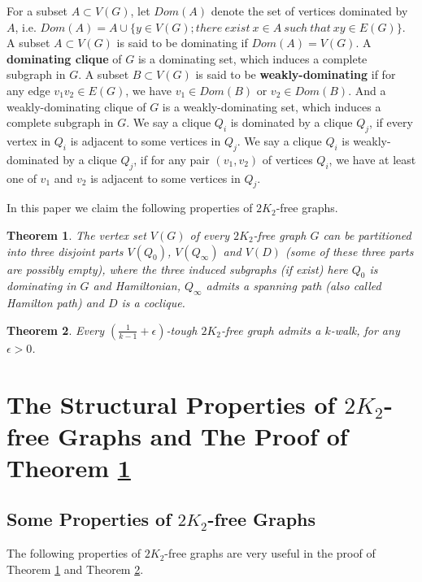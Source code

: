 \documentclass[12pt]{article}
\newtheorem{theorem}{Theorem}
\begin{document}
For a subset $A\subset V(G)$, let $Dom(A)$ denote the set of vertices dominated by $A$, i.e. $Dom(A)=A\cup\{y\in V(G); there~exist~x\in A~such~that~xy\in E(G)\}$. A subset $A\subset V(G)$ is said to be dominating if $Dom(A)=V(G)$. A {\bf dominating clique} of $G$ is a dominating set, which induces a complete subgraph in $G$. A subset $B\subset V(G)$ is said to be {\bf weakly-dominating} if for any edge $v_1v_2\in E(G)$, we have $v_1\in Dom(B)$ or $v_2\in Dom(B)$. And a weakly-dominating clique of $G$ is a weakly-dominating set, which induces a complete subgraph in $G$. We say a clique $Q_i$ is dominated by a clique $Q_j$, if every vertex in $Q_i$ is adjacent to some vertices in $Q_j$. We say a clique $Q_i$ is weakly-dominated by a clique $Q_j$, if for any pair $(v_1,v_2)$ of vertices $Q_i$, we have at least one of $v_1$ and $v_2$ is adjacent to some vertices in $Q_j$.






In this paper we claim the following properties of $2K_2$-free graphs.

\begin{theorem}\label{thm1}
The vertex set $V(G)$ of every $2K_2$-free graph $G$ can be partitioned into three disjoint parts $V(Q_0)$, $V(Q_{\infty})$ and $V(D)$ (some of these three parts are possibly empty), where the three induced subgraphs (if exist) here $Q_0$ is dominating in $G$ and Hamiltonian, $Q_{\infty}$ admits a spanning path (also called Hamilton path) and $D$ is a coclique.
\end{theorem}



\begin{theorem}\label{thm2}
Every $(\frac{1}{k-1}+\epsilon)$-tough $2K_2$-free graph admits a $k$-walk, for any $\epsilon>0$.
\end{theorem}




\section{The Structural Properties of $2K_2$-free Graphs and The Proof of Theorem \ref{thm1}}
\subsection{Some Properties of $2K_2$-free Graphs}
The following properties of $2K_2$-free graphs are very useful in the proof of Theorem \ref{thm1} and Theorem \ref{thm2}.
\end{document}

